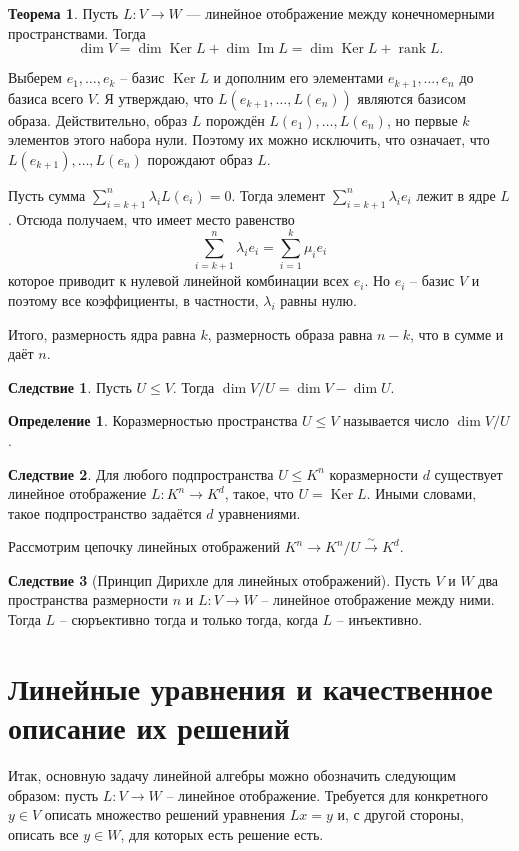 \documentclass[10pt,a4paper,oneside]{book} %
\theoremstyle{definition}
\newtheorem*{defn}{Определение}
\newtheorem{thm}{Теорема}
\newtheorem{cor}{Следствие}
\newcommand{\rank}{\operatorname{rank}}
\DeclareMathOperator{\Ker}{Ker}
\newcommand{\im}{\operatorname{Im}}
\def\dfn{\begin{defn}}
\def\edfn{\end{defn}}
\def\crl{\begin{cor}}
\def\ecrl{\end{cor}}
\begin{document}
\begin{thm}
Пусть $L\colon V \to W$ --- линейное отображение между конечномерными пространствами. Тогда
$$\dim V= \dim \Ker L +  \dim \im L= \dim \Ker L +\rank L.$$
\end{thm}
\proof Выберем $e_1,\dots, e_k$ -- базис $\Ker L$ и дополним его элементами $e_{k+1},\dots,e_n$ до базиса всего $V$. Я утверждаю, что $L(e_{k+1},\dots,L(e_n))$ являются базисом образа. Действительно, образ $L$ порождён $L(e_1),\dots, L(e_n)$, но первые $k$ элементов этого набора нули. Поэтому их можно исключить, что означает, что $L(e_{k+1}), \dots, L(e_n)$ порождают образ $L$.

Пусть сумма $\sum_{i=k+1}^n \lambda_i L(e_i)=0$. Тогда элемент $\sum_{i=k+1}^n \lambda_i e_i $ лежит в ядре $L$. Отсюда получаем, что имеет место равенство $$\sum_{i=k+1}^n \lambda_ie_i = \sum_{i=1}^k \mu_i e_i$$
которое приводит к нулевой линейной комбинации всех $e_i$. Но $e_i$ -- базис $V$ и поэтому все коэффициенты, в частности, $\lambda_i$ равны нулю.

Итого, размерность ядра равна $k$, размерность образа равна $n-k$, что в сумме и даёт $n$.
\endproof

\crl Пусть $U \leq V$. Тогда $\dim V/U= \dim V - \dim U$.
\ecrl

\dfn Коразмерностью пространства $U \leq V$ называется число $\dim V/U$.
\edfn

\crl Для любого подпространства $U \leq K^n$ коразмерности $d$ существует линейное отображение $L\colon K^n \to K^d$, такое, что $U=\Ker L$. Иными словами, такое подпространство задаётся $d$ уравнениями.
\ecrl
\proof Рассмотрим цепочку линейных отображений $K^n \to K^n/U \stackrel{\sim}{\longrightarrow} K^d$.
\endproof

\crl[Принцип Дирихле для линейных отображений] Пусть $V$ и $W$ два пространства размерности $n$ и $L \colon V \to W$ -- линейное отображение между ними. Тогда $L$ -- сюръективно тогда и только тогда, когда $L$ -- инъективно.
\ecrl




\section{Линейные уравнения и качественное описание их решений}
Итак, основную задачу линейной алгебры можно обозначить следующим образом: пусть $L\colon V \to W$ -- линейное отображение. Требуется для конкретного $y\in V$ описать множество решений уравнения $Lx=y$ и, с другой стороны, описать все $y\in W$, для которых есть решение есть.
\end{document}
